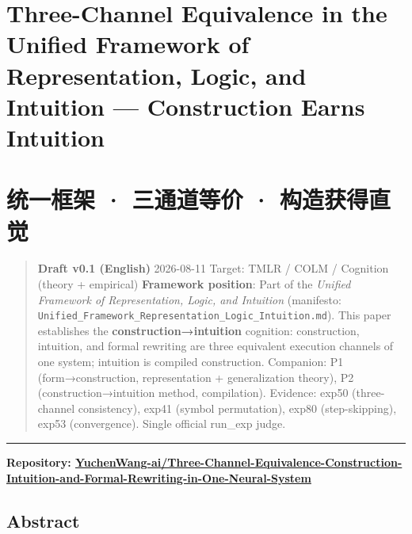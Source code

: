 \documentclass[
]{article}
\author{}
\date{}
\begin{document}
\section{Three-Channel Equivalence in the Unified Framework of
Representation, Logic, and Intuition --- Construction Earns
Intuition}\label{three-channel-equivalence-in-the-unified-framework-of-representation-logic-and-intuition-construction-earns-intuition}

\section{统一框架 · 三通道等价 ·
构造获得直觉}\label{ux7edfux4e00ux6846ux67b6-ux4e09ux901aux9053ux7b49ux4ef7-ux6784ux9020ux83b7ux5f97ux76f4ux89c9}

\begin{quote}
\textbf{Draft v0.1 (English)} \textbar{} 2026-08-11 Target: TMLR / COLM
/ Cognition (theory + empirical) \textbf{Framework position}: Part of
the \emph{Unified Framework of Representation, Logic, and Intuition}
(manifesto:
\texttt{Unified\_Framework\_Representation\_Logic\_Intuition.md}). This
paper establishes the \textbf{construction→intuition} cognition:
construction, intuition, and formal rewriting are three equivalent
execution channels of one system; intuition is compiled construction.
Companion: P1 (form→construction, representation + generalization
theory), P2 (construction→intuition method, compilation). Evidence:
exp50 (three-channel consistency), exp41 (symbol permutation), exp80
(step-skipping), exp53 (convergence). Single official run\_exp judge.
\end{quote}

\begin{center}\rule{0.5\linewidth}{0.5pt}\end{center}

\textbf{Repository:
\href{https://github.com/YuchenWang-ai/Three-Channel-Equivalence-Construction-Intuition-and-Formal-Rewriting-in-One-Neural-System}{YuchenWang-ai/Three-Channel-Equivalence-Construction-Intuition-and-Formal-Rewriting-in-One-Neural-System}}

\subsection{Abstract}\label{abstract}
\end{document}
